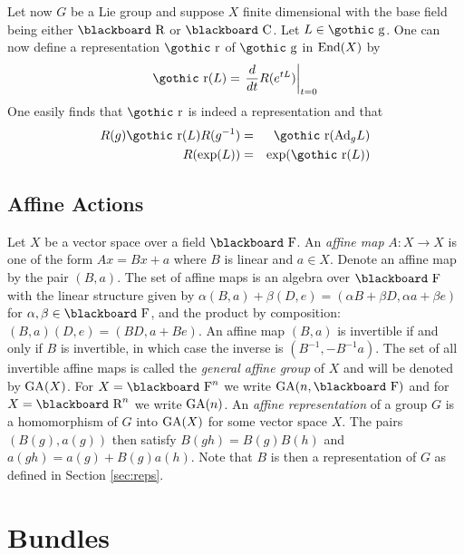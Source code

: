 \documentclass[12pt,titlepage]{article}
\def\bbf#1{\hbox{\blackboard #1}}
\def\goth#1{\hbox{\gothic #1}}
\def\lC{\bbf C}
\def\lF{\bbf F}
\def\lR{\bbf R}
\def\gg{{\goth g}}
\def\gr{{\goth r}}
\def\Ad{\hbox{Ad}}
\def\End{\hbox{End}}
\def\GA{\hbox{GA}}
\begin{document}
Let now \(G\) be a Lie group and suppose \(X\) finite dimensional with
the base field being either \(\lR\) or \(\lC\). Let
\(L\in\gg\). One can now define a representation \(\gr\)
\index{\(R\)@\(\gr\)}%
of \(\gg\)
in \(\End(X)\) by
\begin{equation}\label{eq:derrep}
\gr(L) = \left.\frac{d}{dt}R(e^{tL})\right|_{t=0}
\end{equation}%
One easily finds that \(\gr\) is indeed a representation and that
\begin{eqnarray*}
R(g)\gr(L)R(g^{-1}) &=& \gr(\Ad_g L) \\
R(\exp(L)) &=& \exp(\gr(L))
\end{eqnarray*}


\subsection{Affine Actions}
Let \(X\) be a vector space over a field \(\lF\). An {\em affine map\/}
%
 \(A:X\to X\) is one of the form \(Ax=Bx+a\) where \(B\) is linear and
\(a\in X\). Denote an affine map by the pair \((B,a)\). 
The set of affine maps is an algebra over \(\lF\) with the linear
structure given by 
\(\alpha(B,a)+\beta(D,e)= (\alpha B+\beta D, \alpha a+\beta e)\) for 
\(\alpha, \beta\in \lF\), and the
product by composition: \((B,a)(D,e)=(BD,
a+Be)\). An affine map \((B,a)\) is invertible if and only if \(B\) is
invertible, in which case the inverse is \((B^{-1}, -B^{-1}a)\). 
The set of all invertible affine maps is called the {\em
general affine group\/}
%
 of \(X\) and will be denoted by \(\GA(X)\). 
\index{\(GA(X)\)@\(\GA(X)\)}%
For \(X=\lF^n\) we write \(\GA(n,\lF)\)
\index{\(GA(n,\lF)\)@ \(\GA(n,\lF)\)}%
and for \(X=\lR^n\) we write \(\GA(n)\).
\index{\(GA(n)\)@\(\GA(n)\)}%
An {\em affine representation\/}
%
 of a group \(G\) is a homomorphism of 
\(G\) into
\(\GA(X)\) for some vector space \(X\). The pairs \((B(g), a(g))\) then
satisfy \(B(gh)=B(g)B(h)\) and \(a(gh) = a(g)+B(g)a(h)\). Note that
\(B\) is then a representation of \(G\) as defined in Section
\ref{sec:reps}. 

\section{Bundles}
\end{document}
